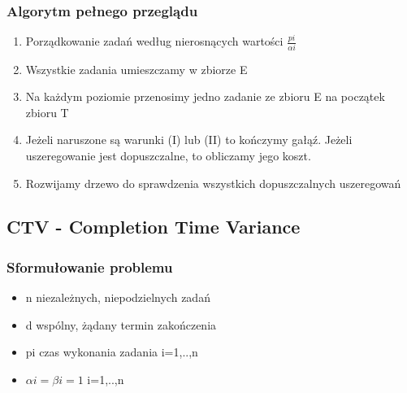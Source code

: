 \documentclass[12pt,a4paper]{article}
\begin{document}
\subsubsection{Algorytm pełnego przeglądu}
\begin{enumerate}
\item Porządkowanie zadań według nierosnących wartości $\frac{pi}{\alpha i}$
\item Wszystkie zadania umieszczamy w zbiorze E
\item Na każdym poziomie przenosimy jedno zadanie ze zbioru E na początek zbioru T
\item Jeżeli naruszone są warunki (I) lub (II) to kończymy gałąź. Jeżeli uszeregowanie jest dopuszczalne, to obliczamy jego koszt.
\item Rozwijamy drzewo do sprawdzenia wszystkich dopuszczalnych uszeregowań
\end{enumerate}
\subsection{CTV - Completion Time Variance}
\subsubsection{Sformułowanie problemu}
\begin{itemize}
\item n niezależnych, niepodzielnych zadań
\item d wspólny, żądany termin zakończenia
\item pi czas wykonania zadania i=1,..,n
\item $\alpha i = \beta i = 1$ i=1,..,n
\end{itemize}
\end{document}
